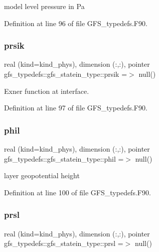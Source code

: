 model level pressure in Pa 



Definition at line 96 of file G\+F\+S\+\_\+typedefs.\+F90.

\mbox{\label{structgfs__typedefs_1_1gfs__statein__type_ad0bd345385a39d8a61d1bb48527c278d}} 
\subsubsection{prsik}
{\footnotesize\ttfamily real (kind=kind\+\_\+phys), dimension (\+:,\+:), pointer gfs\+\_\+typedefs\+::gfs\+\_\+statein\+\_\+type\+::prsik =$>$ null()}



Exner function at interface. 



Definition at line 97 of file G\+F\+S\+\_\+typedefs.\+F90.

\mbox{\label{structgfs__typedefs_1_1gfs__statein__type_a1c57fd635ed7f4a98f0bd4778e1db368}} 
\subsubsection{phil}
{\footnotesize\ttfamily real (kind=kind\+\_\+phys), dimension  (\+:,\+:), pointer gfs\+\_\+typedefs\+::gfs\+\_\+statein\+\_\+type\+::phil =$>$ null()}



layer geopotential height 



Definition at line 100 of file G\+F\+S\+\_\+typedefs.\+F90.

\mbox{\label{structgfs__typedefs_1_1gfs__statein__type_a47e0904c1e79a576dfd798844f46ea47}} 
\subsubsection{prsl}
{\footnotesize\ttfamily real (kind=kind\+\_\+phys), dimension  (\+:,\+:), pointer gfs\+\_\+typedefs\+::gfs\+\_\+statein\+\_\+type\+::prsl =$>$ null()}



